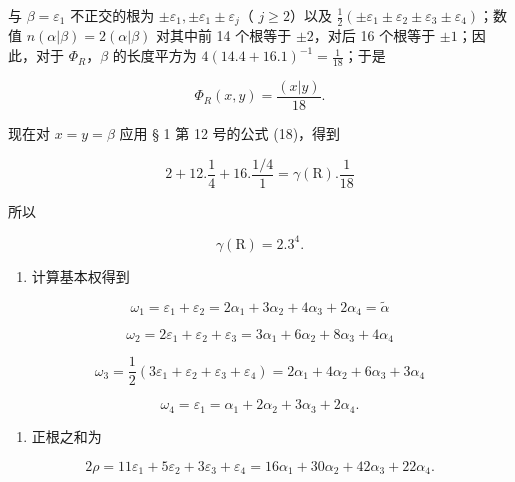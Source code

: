 与 \(\beta = \varepsilon_1\) 不正交的根为 \(\pm \varepsilon_1, \pm \varepsilon_1 \pm \varepsilon_j\)（ \(j \geqslant 2\)）以及 \(\frac{1}{2} (\pm \varepsilon_1 \pm \varepsilon_2 \pm \varepsilon_3 \pm \varepsilon_4)\)；数值 \(n(\alpha | \beta) = 2(\alpha | \beta)\) 对其中前 14 个根等于 \(\pm 2\)，对后 16 个根等于 \(\pm 1\)；因此，对于 \(\Phi_R\)，\(\beta\) 的长度平方为 \(4(14.4 + 16.1)^{-1} = \frac{1}{18}\)；于是

\[
\Phi_ {R} (x, y) = \frac {(x | y)}{18}.
\]

现在对 \(x = y = \beta\) 应用 § 1 第 12 号的公式 (18)，得到

\[
2 + 12. \frac {1}{4} + 16. \frac {1 / 4}{1} = \gamma (\mathrm{R}). \frac {1}{18}
\]

所以

\[
\gamma (\mathrm{R}) = 2. 3 ^ {4}.
\]

\begin{enumerate}
\def\labelenumi{(\Roman{enumi})}
\setcounter{enumi}{5}
\tightlist
\item
  计算基本权得到
\end{enumerate}

\[
\omega_ {1} = \varepsilon_ {1} + \varepsilon_ {2} = 2 \alpha_ {1} + 3 \alpha_ {2} + 4 \alpha_ {3} + 2 \alpha_ {4} = \tilde {\alpha}
\]

\[
\omega_ {2} = 2 \varepsilon_ {1} + \varepsilon_ {2} + \varepsilon_ {3} = 3 \alpha_ {1} + 6 \alpha_ {2} + 8 \alpha_ {3} + 4 \alpha_ {4}
\]

\[
\omega_ {3} = \frac {1}{2} (3 \varepsilon_ {1} + \varepsilon_ {2} + \varepsilon_ {3} + \varepsilon_ {4}) = 2 \alpha_ {1} + 4 \alpha_ {2} + 6 \alpha_ {3} + 3 \alpha_ {4}
\]

\[
\omega_ {4} = \varepsilon_ {1} = \alpha_ {1} + 2 \alpha_ {2} + 3 \alpha_ {3} + 2 \alpha_ {4}.
\]

\begin{enumerate}
\def\labelenumi{(\Roman{enumi})}
\setcounter{enumi}{6}
\tightlist
\item
  正根之和为
\end{enumerate}

\[
2 \rho = 11 \varepsilon_ {1} + 5 \varepsilon_ {2} + 3 \varepsilon_ {3} + \varepsilon_ {4} = 16 \alpha_ {1} + 30 \alpha_ {2} + 42 \alpha_ {3} + 22 \alpha_ {4}.
\]

